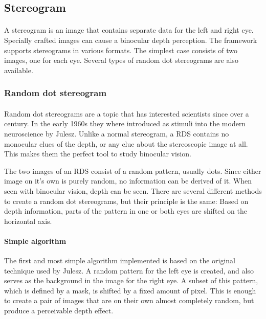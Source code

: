 \subsection{Stereogram\label{Stereogram}}
\paragraph{}
A stereogram is an image that contains separate data for the left and right eye. Specially crafted images can cause a binocular depth perception. The framework supports stereograms in various formats. The simplest case consists of two images, one for each eye. Several types of random dot stereograms are also available.

\subsubsection{Random dot stereogram\label{RDS}}
\paragraph{}
Random dot stereograms are a topic that has interested scientists since over a century\cite{AntRDS}. In the early 1960s they where introduced as stimuli into the modern neuroscience by Julesz\cite{BellRDS}. Unlike a normal stereogram, a RDS contains no monocular clues of the depth, or any clue about the stereoscopic image at all. This makes them the perfect tool to study binocular vision.

The two images of an RDS consist of a random pattern, usually dots. Since either image on it's own is purely random, no information can be derived of it. When seen with binocular vision, depth can be seen. There are several different methods to create a random dot stereograms, but their principle is the same:
Based on depth information, parts of the pattern in one or both eyes are shifted on the horizontal axis.

\paragraph{Simple algorithm}
The first and most simple algorithm implemented is based on the original technique used by Julesz\cite{BellRDS}. A random pattern for the left eye is created, and also serves as the background in the image for the right eye. A subset of this pattern, which is defined by a mask, is shifted by a fixed amount of pixel. This is enough to create a pair of images that are on their own almost completely random, but produce a perceivable depth effect.

